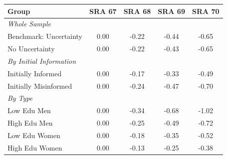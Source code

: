 \begin{tabular}{lcccc}
    \toprule
    Group & SRA 67 & SRA 68 & SRA 69 & SRA 70 \\
    \midrule
    \multicolumn{5}{l}{\textit{Whole Sample}} \\
    Benchmark: Uncertainty & 0.00 & -0.22 & -0.44 & -0.65 \\
    No Uncertainty & 0.00 & -0.22 & -0.43 & -0.65 \\
    \midrule
    \multicolumn{5}{l}{\textit{By Initial Information}} \\
    Initially Informed & 0.00 & -0.17 & -0.33 & -0.49 \\
    Initially Misinformed & 0.00 & -0.24 & -0.47 & -0.70 \\
    \midrule
    \multicolumn{5}{l}{\textit{By Type}} \\
    Low Edu Men & 0.00 & -0.34 & -0.68 & -1.02 \\
    High Edu Men & 0.00 & -0.25 & -0.49 & -0.72 \\
    Low Edu Women & 0.00 & -0.18 & -0.35 & -0.52 \\
    High Edu Women & 0.00 & -0.13 & -0.25 & -0.38 \\
    \bottomrule
\end{tabular}
